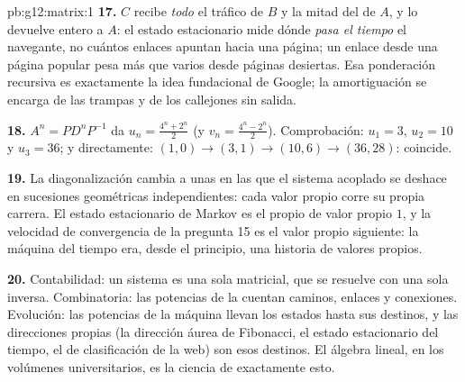 \begin{solution}{pb:g12:matrix:1}
\textbf{17.} $C$ recibe \emph{todo} el tráfico de $B$ y la mitad del de
$A$, y lo devuelve entero a $A$: el estado estacionario mide dónde
\emph{pasa el tiempo} el navegante, no cuántos enlaces apuntan hacia una
página; un enlace desde una página popular pesa más que varios desde
páginas desiertas. Esa ponderación recursiva es exactamente la idea
fundacional de Google; la amortiguación se encarga de las trampas y de los
callejones sin salida.

\textbf{18.} $A^n = P D^n P^{-1}$ da $u_n = \frac{4^n + 2^n}{2}$ (y
$v_n = \frac{4^n - 2^n}{2}$). Comprobación: $u_1 = 3$, $u_2 = 10$ y
$u_3 = 36$; y directamente: $(1,0) \to (3,1) \to (10,6) \to (36, 28)$:
coincide.

\textbf{19.} La diagonalización cambia a unas  en las que el
sistema acoplado se deshace en sucesiones geométricas independientes: cada
valor propio corre su propia carrera. El estado estacionario de Markov es
el  propio de valor propio $1$, y la velocidad de convergencia de la
pregunta 15 es el valor propio siguiente: la máquina del tiempo era, desde
el principio, una historia de valores propios.

\textbf{20.} Contabilidad: un sistema es una sola  matricial, que
se resuelve con una sola inversa. Combinatoria: las potencias de la  cuentan caminos, enlaces y conexiones. Evolución: las
potencias de la máquina llevan los estados hasta sus destinos, y las
direcciones propias (la dirección áurea de Fibonacci, el estado
estacionario del tiempo, el  de clasificación de la web) son esos
destinos. El álgebra lineal, en los volúmenes universitarios, es la ciencia
de exactamente esto.
\end{solution}
